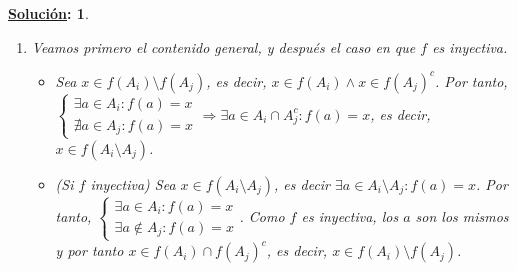 \documentclass[10pt,a4paper,openright]{book}
\theoremstyle{break}
\newtheorem*{ej}{\underline{Solución}:}
\begin{document}
\begin{ej}
\begin{enumerate}[label={(\arabic*)}]
\begin{enumerate}[label={(\alph*)}]
\begin{itemize}
 \item (Si $f$ inyectiva) Sea $x \in \bigcap_i f( A_i)$. Entonces, $\forall i \in I : x \in f(A_i)$. Entonces, $\forall i \in I \ \exists a \in A_i : f(a) = x \Rightarrow \exists a \in \bigcap_i A_i : f(a) = x$, y como la $f$ es inyectiva, $x \in f(\bigcap_i A_i)$.
 \end{itemize}
 \item  Veamos primero el contenido general, y después el caso en que $f$ es inyectiva.
 \begin{itemize}
 \item Sea $x \in f(A_i) \setminus f(A_j)$, es decir, $x \in f(A_i) \wedge x \in f(A_j)^c$. Por tanto, $\begin{cases} \exists a \in A_i : f(a) = x \\ \nexists a \in A_j : f(a) = x  \end{cases}\Rightarrow \exists a \in A_i \cap A_j^c : f(a) = x$, es decir, $x \in f(A_i \setminus A_j)$.
 \item (Si $f$ inyectiva) Sea $x \in f(A_i \setminus A_j)$, es decir $\exists a \in A_i \setminus A_j : f(a)=x$. Por tanto, $\begin{cases} \exists a \in A_i : f(a) = x \\ \exists a \notin A_j : f(a) = x  \end{cases}$. Como $f$ es inyectiva, los $a$ son los mismos y por tanto $x \in f(A_i) \cap f(A_j)^c$, es decir, $x \in f(A_i) \setminus f(A_j)$.
 \end{itemize}
 \end{enumerate}
\end{enumerate}
\end{ej}
\end{document}
